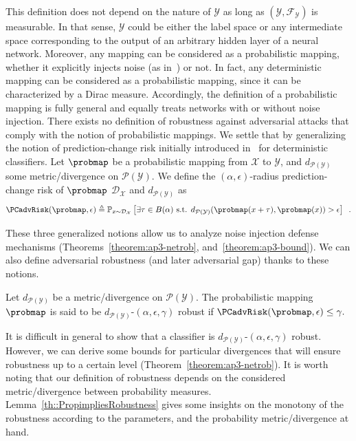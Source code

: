 This definition does not depend on the nature of $\mathcal{Y}$ as long as $(\mathcal{Y},\mathcal{F}_{\mathcal{Y}})$ is measurable.
In that sense, $\mathcal{Y}$ could be either the label space or any intermediate space corresponding to the output of an arbitrary hidden layer of a neural network.
Moreover, any mapping can be considered as a probabilistic mapping, whether it explicitly injects noise (as in~\cite{lecuyer2018certified,rakin2018parametric,dhillon2018stochastic}) or not.
In fact, any deterministic mapping can be considered as a probabilistic mapping, since it can be characterized by a Dirac measure.
Accordingly, the definition of a probabilistic mapping is fully general and equally treats networks with or without noise injection.
There exists no definition of robustness against adversarial attacks that comply with the notion of probabilistic mappings.
We settle that by generalizing the notion of prediction-change risk initially introduced in~\cite{diochnos2018adversarial} for deterministic classifiers.
Let $\probmap$ be a probabilistic mapping from $\mathcal{X}$ to $\mathcal{Y}$, and $d_{\mathcal{P}(\mathcal{Y})}$ some metric/divergence on $\mathcal{P}(\mathcal{Y})$.
We define the $(\alpha,\epsilon)$-radius prediction-change risk of $\probmap$ \wrt $\mathcal{D}_{\mathcal{X}}$ and $d_{\mathcal{P}(\mathcal{Y})}$ as 
\begin{equation}
  \PCadvRisk(\probmap,\epsilon) \triangleq  \mathbb{P}_{x\sim \mathcal{D}_{\mathcal{X}}}\left[ \exists \tau \in B(\alpha) \text{ s.t. } d_{\mathcal{P}(\mathcal{Y})}(\probmap(x+\tau),\probmap(x)) > \epsilon \right] \enspace.
\end{equation}

These three generalized notions allow us to analyze noise injection defense mechanisms (Theorems~\ref{theorem:ap3-netrob}, and~\ref{theorem:ap3-bound}).
We can also define adversarial robustness (and later adversarial gap) thanks to these notions. 

\begin{definition}
  Let $d_{\mathcal{P}(\mathcal{Y})}$ be a metric/divergence on $\mathcal{P}(\mathcal{Y})$.
  The probabilistic mapping $\probmap$ is said to be $d_{\mathcal{P}(\mathcal{Y})}$-$(\alpha, \epsilon, \gamma)$ robust if $\PCadvRisk(\probmap,\epsilon) \leq \gamma.$ 
  \label{def::GeneralizedRobustness}
\end{definition}

It is difficult in general to show that a classifier is $d_{\mathcal{P}(\mathcal{Y})}$-$(\alpha, \epsilon, \gamma)$ robust.
However, we can  derive some bounds for particular divergences that will ensure robustness up to a certain level (Theorem~\ref{theorem:ap3-netrob}).
It is worth noting that our definition of robustness depends on the considered metric/divergence between probability measures.
Lemma~\ref{th::PropimpliesRobustness} gives some insights on the monotony of the robustness according to the parameters, and the probability metric/divergence at hand.

